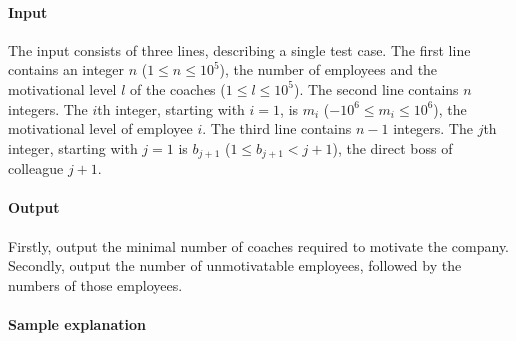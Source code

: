 \paragraph*{Input}

The input consists of three lines, describing a single test case.
The first line contains an integer $n$ ($1 \leq n \leq 10^5$), the number of employees and the motivational level $l$ of the coaches ($1 \leq l \leq 10^5$).
The second line contains $n$ integers. The $i$th integer, starting with $i = 1$, is $m_i$ ($-10^6 \leq m_i \leq 10^6$), the motivational level of employee $i$.
The third line contains $n - 1$ integers. The $j$th integer, starting with $j = 1$ is $b_{j+1}$ ($1 \leq b_{j+1} < j + 1$), the direct boss of colleague $j + 1$.

\paragraph*{Output}

Firstly, output the minimal number of coaches required to motivate the company.
Secondly, output the number of unmotivatable employees, followed by the numbers of those employees.

\paragraph*{Sample explanation}


\begin{samples}
\end{samples}


